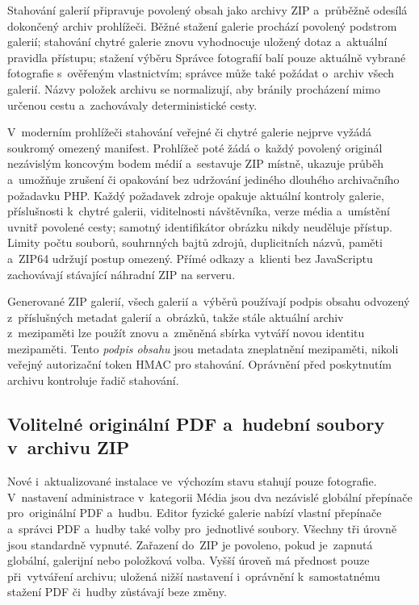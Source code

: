 \documentclass[11pt,a4paper]{article}
\begin{document}
Stahování galerií připravuje povolený obsah jako archivy ZIP a~průběžně odesílá
dokončený archiv prohlížeči. Běžné stažení galerie prochází povolený podstrom
galerií; stahování chytré galerie znovu vyhodnocuje uložený dotaz a~aktuální
pravidla přístupu; stažení výběru Správce fotografií balí pouze aktuálně vybrané
fotografie s~ověřeným vlastnictvím; správce může také požádat o~archiv všech
galerií. Názvy položek archivu se normalizují, aby bránily procházení mimo
určenou cestu a~zachovávaly deterministické cesty.

V~moderním prohlížeči stahování veřejné či chytré galerie nejprve vyžádá
soukromý omezený manifest. Prohlížeč poté žádá o~každý povolený originál
nezávislým koncovým bodem médií a~sestavuje ZIP místně, ukazuje průběh
a~umožňuje zrušení či opakování bez udržování jediného dlouhého archivačního
požadavku PHP. Každý požadavek zdroje opakuje aktuální kontroly galerie,
příslušnosti k~chytré galerii, viditelnosti návštěvníka, verze média a~umístění
uvnitř povolené cesty; samotný identifikátor obrázku nikdy neuděluje přístup.
Limity počtu souborů, souhrnných bajtů zdrojů, duplicitních názvů, paměti
a~ZIP64 udržují postup omezený. Přímé odkazy a~klienti bez JavaScriptu
zachovávají stávající náhradní ZIP na serveru.

Generované ZIP galerií, všech galerií a~výběrů používají podpis obsahu odvozený
z~příslušných metadat galerií a~obrázků, takže stále aktuální archiv
z~mezipaměti lze použít znovu a~změněná sbírka vytváří novou identitu
mezipaměti. Tento \emph{podpis obsahu} jsou metadata zneplatnění mezipaměti,
nikoli veřejný autorizační token HMAC pro stahování. Oprávnění před poskytnutím
archivu kontroluje řadič stahování.

\subsection{Volitelné originální PDF a~hudební soubory v~archivu ZIP}
Nové i~aktualizované instalace ve~výchozím stavu stahují pouze fotografie.
V~nastavení administrace v~kategorii Média jsou dva nezávislé globální přepínače
pro~originální PDF a~hudbu. Editor fyzické galerie nabízí vlastní přepínače
a~správci PDF a~hudby také volby pro~jednotlivé soubory. Všechny tři úrovně jsou
standardně vypnuté. Zařazení do~ZIP je povoleno, pokud je~zapnutá globální,
galerijní nebo položková volba. Vyšší úroveň má přednost pouze při~vytváření
archivu; uložená nižší nastavení i~oprávnění k~samostatnému stažení PDF či~hudby
zůstávají beze změny.
\end{document}
